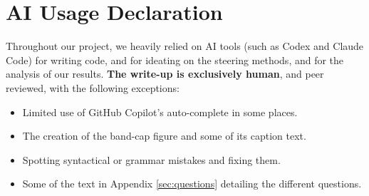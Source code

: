 \section*{AI Usage Declaration}
\label{sec:ai-usage}

Throughout our project, we heavily relied on AI tools (such as Codex and Claude Code) for writing code, and for ideating on the steering methods, and for the analysis of our results. \textbf{The write-up is exclusively human}, and peer reviewed, with the following exceptions:
\begin{itemize}
    \item Limited use of GitHub Copilot's auto-complete in some places.
    \item The creation of the band-cap figure and some of its caption text.
    \item Spotting syntactical or grammar mistakes and fixing them.
    \item Some of the text in Appendix \ref{sec:questions} detailing the different questions.
\end{itemize}

